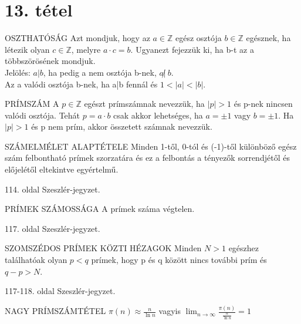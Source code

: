 \section{13. tétel}

\begin{definicio}{OSZTHATÓSÁG}
Azt mondjuk, hogy az $a \in \mathbb{Z}$ egész osztója $b \in \mathbb{Z}$ egésznek, ha létezik olyan $c \in \mathbb{Z}$, melyre $a \cdot c = b$. Ugyanezt fejezzük ki, ha b-t az a többszörösének mondjuk. \\
Jelölés: $a|b$, ha pedig a nem osztója b-nek, $a\!\not|\ b$.\\Az a valódi osztója b-nek, ha a|b fennál és $1 < |a| < |b|$.
\end{definicio}

\begin{definicio}{PRÍMSZÁM}
A $p \in \mathbb{Z}$ egészt prímszámnak nevezzük, ha $|p| > 1$ és p-nek nincsen valódi osztója. Tehát $p = a \cdot b$ csak akkor lehetséges, ha $a = \pm 1$ vagy $b = \pm 1$. Ha $|p| > 1$ és p nem prím, akkor összetett számnak nevezzük.
\end{definicio}

\begin{tetel}{SZÁMELMÉLET ALAPTÉTELE}
Minden 1-től, 0-tól és (-1)-től különböző egész szám felbontható prímek szorzatára és ez a felbontás a tényezők sorrendjétől és előjelétől eltekintve egyértelmű.
\end{tetel}

\begin{bizonyitas}{}
114. oldal Szeszlér-jegyzet.
\end{bizonyitas}

\begin{tetel}{PRÍMEK SZÁMOSSÁGA}
A prímek száma végtelen.
\end{tetel}

\begin{bizonyitas}{}
117. oldal Szeszlér-jegyzet.
\end{bizonyitas}

\begin{tetel}{SZOMSZÉDOS PRÍMEK KÖZTI HÉZAGOK}
Minden $N > 1$ egészhez találhatóak olyan $p < q$ prímek, hogy p és q között nincs további prím és $q-p>N$.
\end{tetel}

\begin{bizonyitas}{}
117-118. oldal Szeszlér-jegyzet.
\end{bizonyitas}

\begin{tetel}{NAGY PRÍMSZÁMTÉTEL}
$\pi(n) \approx \frac{n}{\ln{n}}$ vagyis $\lim_{n\to\infty} \frac{\pi(n)}{\frac{n}{\ln{n}}} = 1$
\end{tetel}

